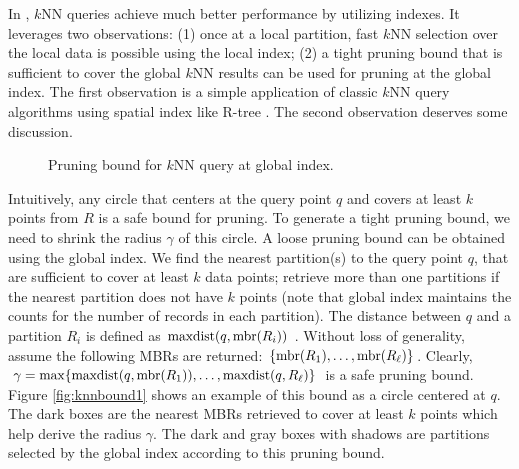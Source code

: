 In \name, $k$NN queries achieve much better performance by utilizing
indexes. It leverages two observations: (1) once at a local partition,
fast $k$NN selection over the local data is possible using the local
index; (2) a tight pruning bound that is sufficient to cover the
global $k$NN results can be used for pruning at the global index. The
first observation is a simple application of classic $k$NN query
algorithms using spatial index like R-tree
\cite{DBLP:conf/sigmod/RoussopoulosKV95}. The second observation
deserves some discussion.
\begin{figure}[htb]
	\caption{Pruning bound for $k$NN query at global index.}%
	\label{fig:knnbound}
\end{figure}

Intuitively, any circle that centers at the query point $q$ and covers
at least $k$ points from $R$ is a safe bound for pruning. To generate
a tight pruning bound, we need to shrink the radius $\gamma$ of this
circle. A loose pruning bound can be obtained using the global index.
We find the nearest partition(s) to the query point $q$, that are
sufficient to cover at least $k$ data points; retrieve more than one
partitions if the nearest partition does not have $k$ points (note
that global index maintains the counts for the number of records in
each partition). The distance between $q$ and a partition $R_i$ is
defined as $\operatorname{maxdist}(q, \operatorname{mbr}(R_i))$
\cite{DBLP:conf/sigmod/RoussopoulosKV95}. Without loss of generality,
assume the following MBRs are returned:
$\{\operatorname{mbr}(R_1), \ldots, \operatorname{mbr}(R_\ell)\}$.  Clearly,
$\gamma=\max\{\operatorname{maxdist}(q, \operatorname{mbr}(R_1)), \ldots, \operatorname{maxdist}(q, R_\ell)\}$
is a safe pruning bound. Figure \ref{fig:knnbound1} shows an example
of this bound as a circle centered at $q$. The dark boxes are the
nearest MBRs retrieved to cover at least $k$ points which help derive
the radius $\gamma$. The dark and gray boxes with shadows are
partitions selected by the global index according to this pruning
bound.

